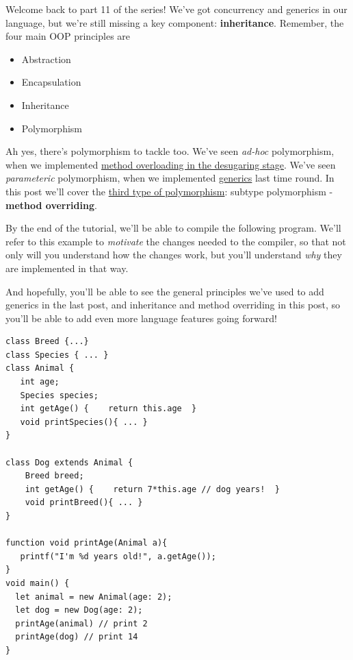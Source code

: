Welcome back to part 11 of the series! We've got concurrency and
generics in our language, but we're still missing a key component:
\textbf{inheritance}. Remember, the four main OOP principles are

\begin{itemize}
\tightlist
\item
  Abstraction
\item
  Encapsulation
\item
  Inheritance
\item
  Polymorphism
\end{itemize}

Ah yes, there's polymorphism to tackle too. We've seen \emph{ad-hoc}
polymorphism, when we implemented
\href{https://mukulrathi.com/create-your-own-programming-language/lower-language-constructs-to-llvm/}{method
overloading in the desugaring stage}. We've seen \emph{parameteric}
polymorphism, when we implemented
\href{https://mukulrathi.com/create-your-own-programming-language/generics-parametric-polymorphism/}{generics}
last time round. In this post we'll cover the
\href{https://en.wikipedia.org/wiki/Polymorphism_(computer_science)}{third
type of polymorphism}: subtype polymorphism - \textbf{method
overriding}.

By the end of the tutorial, we'll be able to compile the following
program. We'll refer to this example to \emph{motivate} the changes
needed to the compiler, so that not only will you understand how the
changes work, but you'll understand \emph{why} they are implemented in
that way.

And hopefully, you'll be able to see the general principles we've used
to add generics in the last post, and inheritance and method overriding
in this post, so you'll be able to add even more language features going
forward!


\begin{verbatim}
class Breed {...}
class Species { ... }
class Animal {  
   int age;  
   Species species;  
   int getAge() {    return this.age  }  
   void printSpecies(){ ... }
}

class Dog extends Animal {  
    Breed breed;  
    int getAge() {    return 7*this.age // dog years!  }  
    void printBreed(){ ... }
}

function void printAge(Animal a){  
   printf("I'm %d years old!", a.getAge());
}
void main() {  
  let animal = new Animal(age: 2);  
  let dog = new Dog(age: 2);
  printAge(animal) // print 2  
  printAge(dog) // print 14
}
\end{verbatim}

